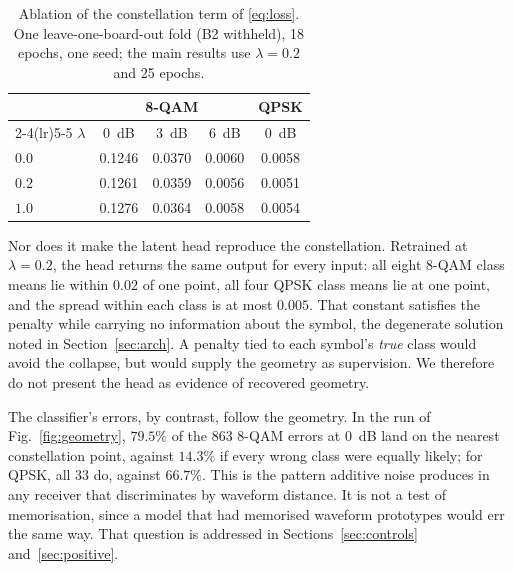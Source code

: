 \documentclass{ieeeaccess}
\begin{document}
\begin{table}[!t]
\caption{Ablation of the constellation term of \eqref{eq:loss}. One
leave-one-board-out fold (B2 withheld), 18 epochs, one seed; the main results
use $\lambda = 0.2$ and 25 epochs.}
\label{tab:ablation}
\centering
\begin{tabular}{lcccc}
\toprule
& \multicolumn{3}{c}{8-QAM} & QPSK \\
\cmidrule(lr){2-4}\cmidrule(lr){5-5}
$\lambda$ & $0$~dB & $3$~dB & $6$~dB & $0$~dB \\
\midrule
$0.0$ & 0.1246 & 0.0370 & 0.0060 & 0.0058 \\
$0.2$ & 0.1261 & 0.0359 & 0.0056 & 0.0051 \\
$1.0$ & 0.1276 & 0.0364 & 0.0058 & 0.0054 \\
\bottomrule
\end{tabular}
\end{table}

Nor does it make the latent head reproduce the constellation. Retrained at
$\lambda = 0.2$, the head returns the same output for every input: all eight
8-QAM class means lie within $0.02$ of one point, all four QPSK class means lie
at one point, and the spread within each class is at most $0.005$. That
constant satisfies the penalty while carrying no information about the symbol,
the degenerate solution noted in Section~\ref{sec:arch}. A penalty tied to each
symbol's \emph{true} class would avoid the collapse, but would supply the
geometry as supervision. We therefore do not present the head as evidence of
recovered geometry.

The classifier's errors, by contrast, follow the geometry. In the run of
Fig.~\ref{fig:geometry}, $79.5\%$ of the $863$ 8-QAM errors at $0$~dB land on
the nearest constellation point, against $14.3\%$ if every wrong class were
equally likely; for QPSK, all $33$ do, against $66.7\%$. This is the pattern
additive noise produces in any receiver that discriminates by waveform
distance. It is not a test of memorisation, since a model that had memorised
waveform prototypes would err the same way. That question is addressed in
Sections~\ref{sec:controls} and~\ref{sec:positive}.
\end{document}
